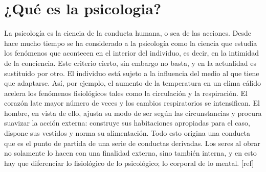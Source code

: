 \section{¿Qué es la psicologia?}

La psicología es la ciencia de la conducta humana, o sea de las acciones.
Desde hace mucho tiempo se ha considerado a la psicología como la ciencia que estudia
los fenómenos que acontecen en el interior del individuo, es decir, en la intimidad de la
conciencia. Este criterio cierto, sin embargo no basta, y en la actualidad es sustituido
por otro. El individuo está sujeto a la influencia del medio al que tiene que adaptarse.
Así, por ejemplo, el aumento de la temperatura en un clima cálido acelera los
fenómenos fisiológicos tales como la circulación y la respiración. El corazón late mayor
número de veces y los cambios respiratorios se intensifican. El hombre, en vista de ello,
ajusta su modo de ser según las circunstancias y procura suavizar la acción externa:
construye sus habitaciones apropiadas para el caso, dispone sus vestidos y norma su
alimentación. Todo esto origina una conducta que es el punto de partida de una serie de
conductas derivadas. Los seres al obrar no solamente lo hacen con una finalidad
externa, sino también interna, y en esto hay que diferenciar lo fisiológico de lo
psicológico; lo corporal de lo mental. [ref]